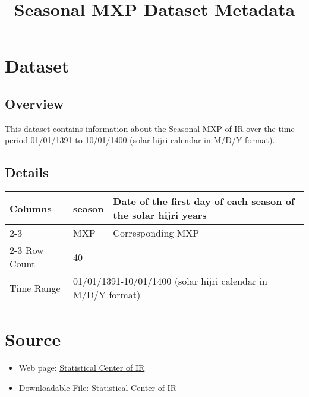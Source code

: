 \documentclass[fleqn]{report}
\begin{document}
\pagestyle{fancy}
\fancyhf{}

\title{Seasonal MXP Dataset Metadata}
\date{}
\maketitle

\newpage

\chapter*{Dataset}
\section*{Overview}
This dataset contains information about the Seasonal MXP of IR over the time period 01/01/1391 to 10/01/1400 (solar hijri calendar in M/D/Y format).
\section*{Details}
\begin{center}
    \begin{tabular}{|l|ll|}
        \hline
        \multirow{3}{*}{Columns} & \multicolumn{1}{l|}{season}       & Date of the first day of each season of the solar hijri years                           \\ \cline{2-3} 
                                 & \multicolumn{1}{l|}{MXP}  & Corresponding MXP      \\ \cline{2-3} \hline
        Row Count                & \multicolumn{2}{l|}{40}                                                        \\ \hline
        Time Range               & \multicolumn{2}{l|}{01/01/1391-10/01/1400 (solar hijri calendar in M/D/Y format)}                         \\ \hline
    \end{tabular}
\end{center}

\chapter*{Source}
\begin{itemize}
    \item Web page: \href{https://www.amar.org.ir/%D9%BE%D8%A7%DB%8C%DA%AF%D8%A7%D9%87-%D9%87%D8%A7-%D9%88-%D8%B3%D8%A7%D9%85%D8%A7%D9%86%D9%87-%D9%87%D8%A7/%D8%B3%D8%B1%DB%8C%D9%87%D8%A7%DB%8C-%D8%B2%D9%85%D8%A7%D9%86%DB%8C/agentType/ViewType/PropertyTypeID/2068}{Statistical Center of IR}
    \item Downloadable File: \href{https://www.amar.org.ir/Portals/0/PropertyAgent/461/Files/13386/2304y220530004.xlsx}{Statistical Center of IR}
\end{itemize}

 
\end{document}
